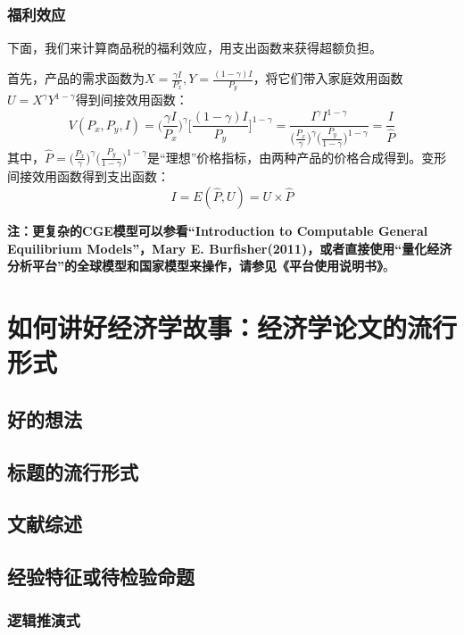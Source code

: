 \documentclass[cn,10pt,math=newtx,citestyle=gb7714-2015,bibstyle=gb7714-2015]{elegantbook}
\begin{document}
	\subsection{福利效应}
	下面，我们来计算商品税的福利效应，用支出函数来获得超额负担。
	
	首先，产品的需求函数为$X=\frac{\gamma I}{P_x},Y=\frac{(1-\gamma)I}{P_y}$，将它们带入家庭效用函数$U=X^{\gamma}Y^{1-\gamma}$得到间接效用函数：
	\begin{equation}
		V(P_x,P_y,I)=\bigg(\frac{\gamma I}{P_x}\bigg)^\gamma\bigg[\frac{(1-\gamma)I}{P_y}\bigg]^{1-\gamma}=\frac{I^\gamma I^{1-\gamma}}{\bigg(\frac{P_x}{\gamma}\bigg)^{\gamma}\bigg(\frac{P_y}{1-\gamma}\bigg)^{1-\gamma}}=\frac{I}{\hat{P}}
	\end{equation}
	其中，$\hat{P}=\bigg(\frac{P_x}{\gamma}\bigg)^{\gamma}\bigg(\frac{P_y}{1-\gamma}\bigg)^{1-\gamma}$是“理想”价格指标，由两种产品的价格合成得到。变形间接效用函数得到支出函数：
	\begin{equation}
		I=E(\hat{P},U)=U\times \hat{P}
	\end{equation}
	
	
	
	
	
	\textbf{注：更复杂的CGE模型可以参看“Introduction to Computable General Equilibrium Models”，Mary E. Burfisher(2011)，或者直接使用“量化经济分析平台”的全球模型和国家模型来操作，请参见《平台使用说明书》}。
	
	
	\chapter{如何讲好经济学故事：经济学论文的流行形式}
	
	\section{好的想法}
	
	\section{标题的流行形式}
	
	\section{文献综述}
	
	\section{经验特征或待检验命题}
	\subsection{逻辑推演式}
	
\end{document}
